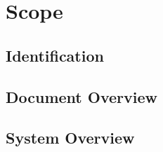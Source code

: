 \chapter{Scope \\
\label{Chapter::Scope}}



\section{Identification\label{Section::Project Identification} }


\section { Document Overview \label{Section::Document Overview} }



\section{System Overview\label{Section::System Overview}}

